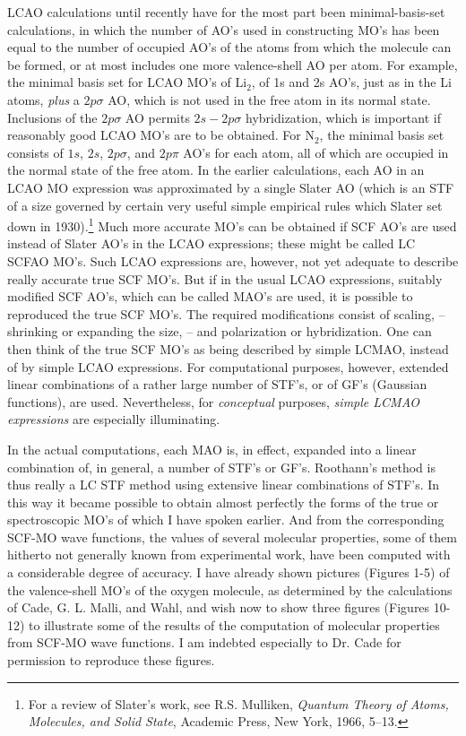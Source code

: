 \documentclass[11pt]{memoir}
\begin{document}
LCAO calculations until recently have for the most part been minimal-basis-set calculations, in which the number of AO's used in constructing MO's has been equal to the number of occupied AO's of the atoms from which the molecule can be formed, or at most includes one more valence-shell AO per atom.  For example, the minimal basis set for LCAO MO's of $\mathrm{Li_2}$, of 1s and 2s AO's, just as in the Li atoms, \emph{plus} a $2p\sigma$ AO, which is not used in the free atom in its normal state.  Inclusions of the $2p\sigma$ AO permits $2s-2p\sigma$ hybridization, which is important if reasonably good LCAO MO's are to be obtained.  For $\mathrm{N_2}$, the minimal basis set consists of $1s$, $2s$, $2p\sigma$, and $2p\pi$ AO's for each atom, all of which are occupied in the normal state of the free atom.  In the earlier calculations, each AO in an LCAO MO expression was approximated by a single Slater AO (which is an STF of a size governed by certain very useful simple empirical rules which Slater set down in 1930).\footnote{For a review of Slater's work, see R.S. Mulliken, \emph{Quantum Theory of Atoms, Molecules, and Solid State}, Academic Press, New York, 1966, 5--13.}  Much more accurate MO's can be obtained if SCF AO's are used instead of Slater AO's in the LCAO expressions; these might be called LC SCFAO MO's.  Such LCAO expressions are, however, not yet adequate to describe really accurate true SCF MO's.  But if in the usual LCAO expressions, suitably modified SCF AO's, which can be called MAO's are used, it is possible to reproduced the true SCF MO's.  The required modifications consist of scaling, -- shrinking or expanding the size, -- and polarization or hybridization.  One can then think of the true SCF MO's as being described by simple LCMAO, instead of by simple LCAO expressions.  For computational purposes, however, extended linear combinations of a rather large number of STF's, or of GF's (Gaussian functions), are used.  Nevertheless, for \emph{conceptual} purposes, \emph{simple LCMAO expressions} are especially illuminating.

In the actual computations, each MAO is, in effect, expanded into a linear combination of, in general, a number of STF's or GF's.  Roothann's method is thus really a LC STF method using extensive linear combinations of STF's.  In this way it became possible to obtain almost perfectly the forms of the true or spectroscopic MO's of which I have spoken earlier.  And from the corresponding SCF-MO wave functions, the values of several molecular properties, some of them hitherto not generally known from experimental work, have been computed with a considerable degree of accuracy.  I have already shown pictures (Figures 1-5) of the valence-shell MO's of the oxygen molecule, as determined by the calculations of Cade, G. L. Malli, and Wahl, and wish now to show three figures (Figures 10-12) to illustrate some of the results of the computation of molecular properties from SCF-MO wave functions.  I am indebted especially to Dr. Cade for permission to reproduce these figures.
\end{document}

